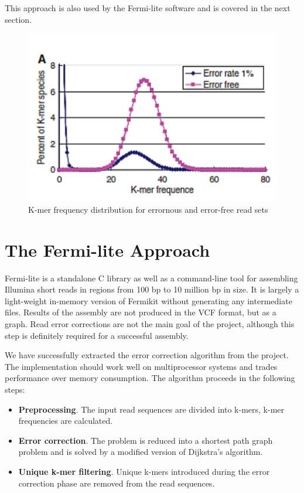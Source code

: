This approach is also used by the Fermi-lite\cite{fermi-lite} software and is covered in the next section.

\begin{figure}[h]
	\centering
	\includegraphics{img/kmer-frequency-distribution.pdf}
	\caption{K-mer frequency distribution for errornous and error-free read sets\cite{alg-compare}}
	\label{fig:kmer-frequency-distribution}
\end{figure}

\section{The Fermi-lite Approach}
\label{sec:fermi-lite}

Fermi-lite is a standalone C library as well as a command-line tool for assembling Illumina short reads in regions from 100 bp to 10 million bp in size. It is largely a light-weight in-memory version of Fermikit\cite{fermikit} without generating any intermediate files\cite{fermi-lite}. Results of the assembly are not produced in the VCF format, but as a graph. Read error corrections are not the main goal of the project, although this step is definitely required for a successful assembly.

We have successfully extracted the error correction algorithm from the project. The implementation should work well on multiprocessor systems and trades performance over memory consumption. The algorithm proceeds in the following steps:
\begin{itemize}
\item \textbf{Preprocessing}. The input read sequences are divided into k-mers, k-mer frequencies are calculated.
\item \textbf{Error correction}. The problem is reduced into a shortest path graph problem and is solved by a modified version of Dijkstra's algorithm.
\item \textbf{Unique k-mer filtering}. Unique k-mers introduced during the error correction phase are removed from the read sequences.
\end{itemize}
 
